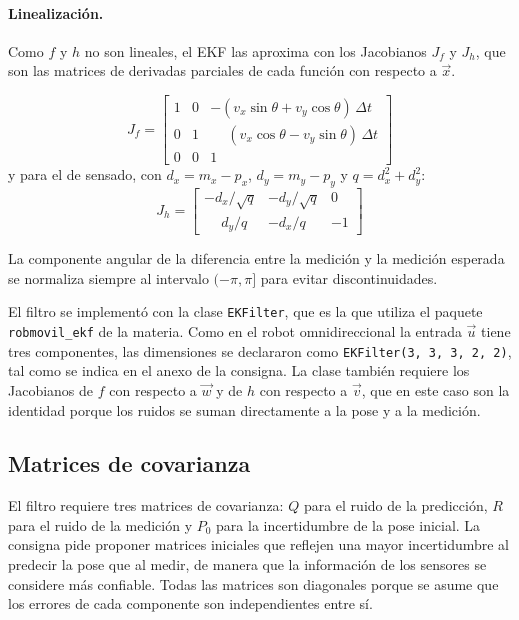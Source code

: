 \documentclass[11pt,a4paper]{article}
\begin{document}
\paragraph{Linealización.} Como $f$ y $h$ no son lineales, el EKF las aproxima con los Jacobianos $J_f$ y $J_h$, que son las matrices de derivadas parciales de cada función con respecto a $\vec{x}$. 

\begin{equation}
J_f =
\begin{bmatrix}
1 & 0 & -(v_x\sin\theta + v_y\cos\theta)\,\Delta t \\
0 & 1 & \phantom{-}(v_x\cos\theta - v_y\sin\theta)\,\Delta t \\
0 & 0 & 1
\end{bmatrix}
\end{equation}
y para el de sensado, con $d_x = m_x - p_x$, $d_y = m_y - p_y$ y $q = d_x^2 + d_y^2$:
\begin{equation}
J_h =
\begin{bmatrix}
-d_x/\sqrt{q} & -d_y/\sqrt{q} & 0 \\
\phantom{-}d_y/q & -d_x/q & -1
\end{bmatrix}
\end{equation}

La componente angular de la diferencia entre la medición y la medición esperada se normaliza siempre al intervalo $(-\pi, \pi]$ para evitar discontinuidades.

El filtro se implementó con la clase \texttt{EKFilter}, que es la que utiliza el paquete \texttt{robmovil\_ekf} de la materia. Como en el robot omnidireccional la entrada $\vec{u}$ tiene tres componentes, las dimensiones se declararon como \texttt{EKFilter(3, 3, 3, 2, 2)}, tal como se indica en el anexo de la consigna. La clase también requiere los Jacobianos de $f$ con respecto a $\vec{w}$ y de $h$ con respecto a $\vec{v}$, que en este caso son la identidad porque los ruidos se suman directamente a la pose y a la medición.

\subsection{Matrices de covarianza}

El filtro requiere tres matrices de covarianza: $Q$ para el ruido de la predicción, $R$ para el ruido de la medición y $P_0$ para la incertidumbre de la pose inicial. La consigna pide proponer matrices iniciales que reflejen una mayor incertidumbre al predecir la pose que al medir, de manera que la información de los sensores se considere más confiable. Todas las matrices son diagonales porque se asume que los errores de cada componente son independientes entre sí. 
\end{document}
